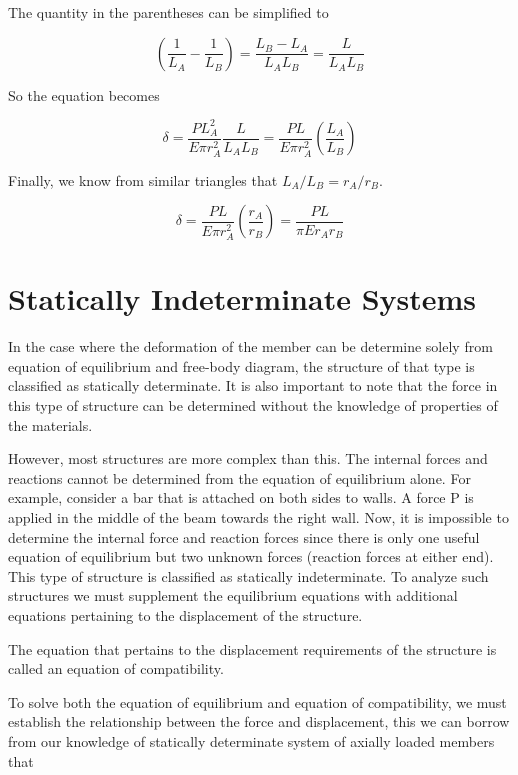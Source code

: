 \documentclass[
10pt,
a4paper,
openany,
svgnames,
]{book} %
\begin{document}
\begin{solution}
The quantity in the parentheses can be simplified to

\[\left( {\frac{1}{{{L_A}}} - \frac{1}{{{L_B}}}} \right) = \frac{{{L_B} - {L_A}}}{{{L_A}{L_B}}} = \frac{L}{{{L_A}{L_B}}}\]	

So the equation becomes

\[\delta  = \frac{{PL_A^2}}{{E\pi r_A^2}}\frac{L}{{{L_A}{L_B}}} = \frac{{PL}}{{E\pi r_A^2}}\left( {\frac{{{L_A}}}{{{L_B}}}} \right)\]	

Finally, we know from similar triangles that $L_A/L_B = r_A/r_B$.

\[\delta  = \frac{{PL}}{{E\pi r_A^2}}\left( {\frac{{{r_A}}}{{{r_B}}}} \right) = \frac{{PL}}{{\pi E{r_A}{r_B}}}\]

\end{solution}

\section{Statically Indeterminate Systems}

In the case where the deformation of the member can be determine solely from equation of equilibrium and free-body diagram, the structure of that type is classified as statically determinate. It is also important to note that the force in this type of structure can be determined without the knowledge of properties of the materials.

However, most structures are more complex than this. The internal forces and reactions cannot be determined from the equation of equilibrium alone. For example, consider a bar that is attached on both sides to walls. A force P is applied in the middle of the beam towards the right wall. Now, it is impossible to determine the internal force and reaction forces since there is only one useful equation of equilibrium but two unknown forces (reaction forces at either end). This type of structure is classified as statically indeterminate. To analyze such structures we must supplement the equilibrium equations with additional equations pertaining to the displacement of the structure.

The equation that pertains to the displacement requirements of the structure is called an equation of compatibility.

To solve both the equation of equilibrium and equation of compatibility, we must establish the relationship between the force and displacement, this we can borrow from our knowledge of statically determinate system of axially loaded members that
	
\end{document}
